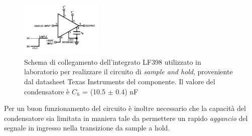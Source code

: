 \documentclass[journal]{IEEEtran}
\begin{document}
\begin{figure}[H]%
\begin{center}
\includegraphics[width=0.35\textwidth]{sch-simulations/digital/output/lf398.png}
\caption{Schema di collegamento dell'integrato LF398 utilizzato in laboratorio per realizzare il circuito di \textit{sample and hold}, proveniente dal datasheet Texas Instruments del componente. Il valore del condensatore è $C_h$ = (10.5 $\pm$ 0.4) nF}
\label{fig:circuit_sample_and_hold}
\end{center}
\end{figure}
Per un buon funzionamento del circuito è inoltre necessario che la capacità del condensatore sia limitata in maniera tale da permettere un rapido \textit{aggancio} del segnale in ingresso nella transizione da sample a hold.
\end{document}
